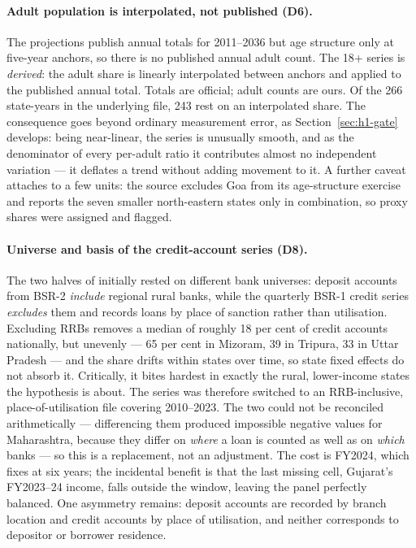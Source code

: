 \paragraph{Adult population is interpolated, not published (D6).} The projections publish annual
totals for 2011--2036 but age structure only at five-year anchors, so there is no published annual
adult count. The 18+ series is \emph{derived}: the adult share is linearly interpolated between
anchors and applied to the published annual total. Totals are official; adult counts are ours. Of
the 266 state-years in the underlying file, 243 rest on an interpolated share. The consequence goes
beyond ordinary measurement error, as Section~\ref{sec:h1-gate} develops: being near-linear, the
series is unusually smooth, and as the denominator of every per-adult ratio it contributes almost no
independent variation --- it deflates a trend without adding movement to it. A further caveat
attaches to a few units: the source excludes Goa from its age-structure exercise and reports the
seven smaller north-eastern states only in combination, so proxy shares were assigned and flagged.

\paragraph{Universe and basis of the credit-account series (D8).} The two halves of \Access{}
initially rested on different bank universes: deposit accounts from BSR-2 \emph{include} regional
rural banks, while the quarterly BSR-1 credit series \emph{excludes} them and records loans by place
of sanction rather than utilisation. Excluding RRBs removes a median of roughly 18 per cent of
credit accounts nationally, but unevenly --- 65 per cent in Mizoram, 39 in Tripura, 33 in Uttar
Pradesh --- and the share drifts within states over time, so state fixed effects do not absorb it.
Critically, it bites hardest in exactly the rural, lower-income states the hypothesis is about. The
series was therefore switched to an RRB-inclusive, place-of-utilisation file covering 2010--2023.
The two could not be reconciled arithmetically --- differencing them produced impossible negative
values for Maharashtra, because they differ on \emph{where} a loan is counted as well as on
\emph{which} banks --- so this is a replacement, not an adjustment. The cost is FY2024, which fixes
\panelA{} at six years; the incidental benefit is that the last missing cell, Gujarat's FY2023--24
income, falls outside the window, leaving the panel perfectly balanced. One asymmetry remains:
deposit accounts are recorded by branch location and credit accounts by place of utilisation, and
neither corresponds to depositor or borrower residence.

